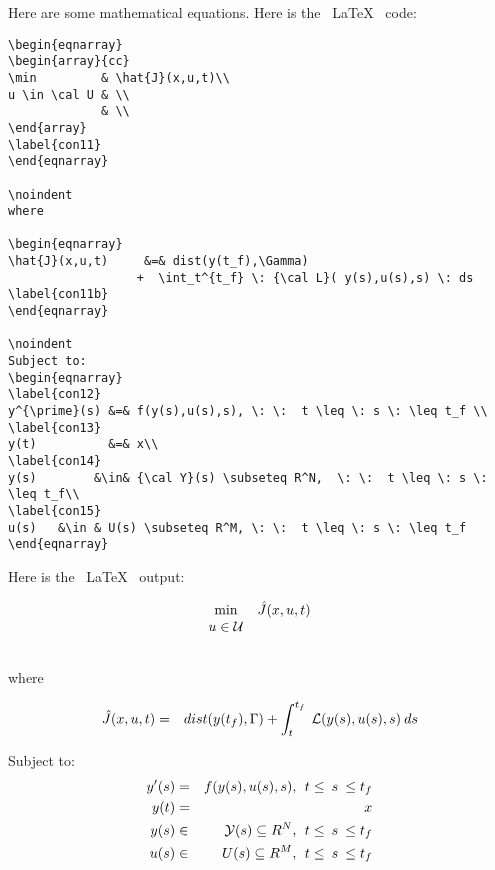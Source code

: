 \documentclass[11pt]{SelfArxOneColBMN}
\begin{document}
Here are some mathematical equations.  Here is the ~\LaTeX~ 
code:

\singlespacing 
{}
\begin{lstlisting}
\begin{eqnarray}
\begin{array}{cc}
\min         & \hat{J}(x,u,t)\\
u \in \cal U & \\
             & \\
\end{array}
\label{con11}
\end{eqnarray}

\noindent
where

\begin{eqnarray}
\hat{J}(x,u,t)     &=& dist(y(t_f),\Gamma) 
                  +  \int_t^{t_f} \: {\cal L}( y(s),u(s),s) \: ds 
\label{con11b}
\end{eqnarray}

\noindent
Subject to:
\begin{eqnarray}
\label{con12}
y^{\prime}(s) &=& f(y(s),u(s),s), \: \:  t \leq \: s \: \leq t_f \\ 
\label{con13}
y(t)          &=& x\\
\label{con14}
y(s)        &\in& {\cal Y}(s) \subseteq R^N,  \: \:  t \leq \: s \: \leq t_f\\
\label{con15}
u(s)   &\in & U(s) \subseteq R^M, \: \:  t \leq \: s \: \leq t_f 
\end{eqnarray}
\end{lstlisting}
\onehalfspacing
\lstset{fancyvrb=false}

\noindent
Here is the ~\LaTeX~ output:

\begin{eqnarray}
\begin{array}{cc}
\min         & \hat{J}(x,u,t)\\
u \in \cal U & \\
             & \\
\end{array}
\label{con11}
\end{eqnarray}

\noindent
where

\begin{eqnarray}
\hat{J}(x,u,t)     &=& dist(y(t_f),\Gamma) 
                  +  \int_t^{t_f} \: {\cal L}( y(s),u(s),s) \: ds 
\label{con11b}
\end{eqnarray}

\noindent
Subject to:
\begin{eqnarray}
\label{con12}
y^{\prime}(s) &=& f(y(s),u(s),s), \: \:  t \leq \: s \: \leq t_f \\ 
\label{con13}
y(t)          &=& x\\
\label{con14}
y(s)        &\in& {\cal Y}(s) \subseteq R^N,  \: \:  t \leq \: s \: \leq t_f\\
\label{con15}
u(s)   &\in & U(s) \subseteq R^M, \: \:  t \leq \: s \: \leq t_f 
\end{eqnarray}
\end{document}
